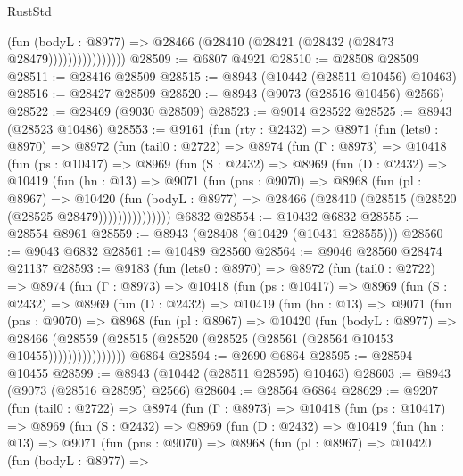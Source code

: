 \begin{lexlean}{RustStd}
\begin{coremodule}
                          (fun (bodyL : @8977) =>
                          @28466 (@28410 (@28421 (@28432 (@28473 @28479))))))))))))))))
@28509 := @6807 @4921
@28510 := @28508 @28509
@28511 := @28416 @28509
@28515 := @8943 (@10442 (@28511 @10456) @10463)
@28516 := @28427 @28509
@28520 := @8943 (@9073 (@28516 @10456) @2566)
@28522 := @28469 (@9030 @28509)
@28523 := @9014 @28522
@28525 := @8943 (@28523 @10486)
@28553 := @9161
    (fun (rty : @2432) =>
    @8971
      (fun (lets0 : @8970) =>
      @8972
        (fun (tail0 : @2722) =>
        @8974
          (fun (Γ : @8973) =>
          @10418
            (fun (ps : @10417) =>
            @8969
              (fun (S : @2432) =>
              @8969
                (fun (D : @2432) =>
                @10419
                  (fun (hn : @13) =>
                  @9071
                    (fun (pns : @9070) =>
                    @8968
                      (fun (pl : @8967) =>
                      @10420
                        (fun (bodyL : @8977) =>
                        @28466 (@28410 (@28515 (@28520 (@28525 @28479)))))))))))))))
    @6832
@28554 := @10432 @6832
@28555 := @28554 @8961
@28559 := @8943 (@28408 (@10429 (@10431 @28555)))
@28560 := @9043 @6832
@28561 := @10489 @28560
@28564 := @9046 @28560 @28474 @21137
@28593 := @9183
    (fun (lets0 : @8970) =>
    @8972
      (fun (tail0 : @2722) =>
      @8974
        (fun (Γ : @8973) =>
        @10418
          (fun (ps : @10417) =>
          @8969
            (fun (S : @2432) =>
            @8969
              (fun (D : @2432) =>
              @10419
                (fun (hn : @13) =>
                @9071
                  (fun (pns : @9070) =>
                  @8968
                    (fun (pl : @8967) =>
                    @10420
                      (fun (bodyL : @8977) =>
                      @28466
                        (@28559
                          (@28515 (@28520 (@28525 (@28561 (@28564 @10453 @10455))))))))))))))))
    @6864
@28594 := @2690 @6864
@28595 := @28594 @10455
@28599 := @8943 (@10442 (@28511 @28595) @10463)
@28603 := @8943 (@9073 (@28516 @28595) @2566)
@28604 := @28564 @6864
@28629 := @9207
    (fun (tail0 : @2722) =>
    @8974
      (fun (Γ : @8973) =>
      @10418
        (fun (ps : @10417) =>
        @8969
          (fun (S : @2432) =>
          @8969
            (fun (D : @2432) =>
            @10419
              (fun (hn : @13) =>
              @9071
                (fun (pns : @9070) =>
                @8968
                  (fun (pl : @8967) =>
                  @10420
                    (fun (bodyL : @8977) =>

\end{coremodule}
\end{lexlean}

